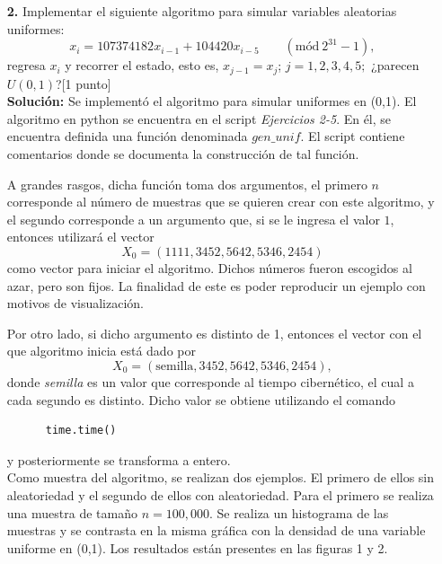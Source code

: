 \documentclass[letterpaper]{article}
\renewcommand{\P}{\mathbb{P}}
\newcommand{\1}{\mathds{1}}
\theoremstyle{definition}
\theoremstyle{definition}
\theoremstyle{definition}
\theoremstyle{definition}
\theoremstyle{definition}
\begin{document}
\begin{enumerate}
\begin{proof}
         Se tiene pues la igualdad de los conjuntos anteriores y por lo tanto de sus complementos. Esto significa que 
         \[
         \P\left(F_X^{-}(u)\leq t\right)=\P\left(u\leq F_X(t)\right),
         \]
         pero $u\sim U(0,1)$, por lo que 
         \[
         \P\left(u\leq F_X(t)\right) =F_X(t),
         \]
         es decir, 
         \[
          \P\left(F_X^{-}(u)\leq t\right)=F_X(t),
         \]
         y concluimos.
        \end{proof}

    \item[\textbf{2.}]Implementar el siguiente algoritmo para simular variables aleatorias 
    uniformes:
    \[
    x_i=107374182x_{i-1}+104420x_{i-5} \qquad (\text{mód} \ 2^{31}-1),
    \]
    regresa $x_i$ y recorrer el estado, esto es, $x_{j-1}=x_{j}$; $j=1,2,3,4,5;$ ¿parecen $U(0,1)$?[1 punto]\\

    \textbf{Solución:} Se implementó el algoritmo para simular uniformes en (0,1). El algoritmo en python se encuentra en el script \textit{Ejercicios 2-5}.
    En él, se encuentra definida una función denominada \textit{$gen\_unif$}. El script contiene comentarios
    donde se documenta la construcción de tal función.

    A grandes rasgos, dicha función toma dos argumentos, el primero $n$ corresponde 
    al número de muestras que se quieren crear con este algoritmo, y el segundo corresponde
    a un argumento que, si se le ingresa el valor $1$, entonces utilizará el vector
    \[
    X_0=\left(1111,3452,5642,5346,2454\right)
    \]
    como vector para iniciar el algoritmo. Dichos números fueron escogidos 
    al azar, pero son fijos. La finalidad de este es poder reproducir un ejemplo 
    con motivos de visualización.

    Por otro lado, si dicho argumento es distinto de 1, entonces el vector 
    con el que algoritmo inicia está dado por 
    \[
      X_0=\left(\text{semilla},3452,5642,5346,2454\right),
    \]
    donde \textit{semilla} es un valor que corresponde al tiempo cibernético, el 
    cual a cada segundo es distinto. Dicho valor se obtiene utilizando el comando \begin{verbatim}
      time.time()
    \end{verbatim} y posteriormente se transforma a entero.\\

    Como muestra del algoritmo, se realizan dos ejemplos. El primero de ellos sin 
    aleatoriedad y el segundo de ellos con aleatoriedad. Para el primero se 
    realiza una muestra de tamaño $n=100,000$. Se realiza un histograma de las muestras y 
    se contrasta en la misma gráfica con la densidad de una variable uniforme 
    en (0,1). Los resultados están presentes en las figuras 1 y 2.\\


\end{enumerate}
\end{document}
